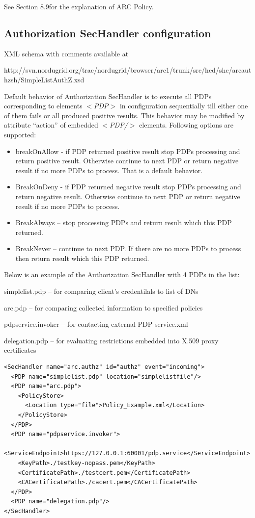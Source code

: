\documentclass{article}                            %
\begin{document}
See Section 8.9for the explanation of ARC Policy.


\subsection{Authorization SecHandler configuration} %
\label{subsec:authzhandler_conf}
XML schema with comments available at

http://svn.nordugrid.org/trac/nordugrid/browser/arc1/trunk/src/hed/shc/arcauthzsh/SimpleListAuthZ.xsd

Default behavior of Authorization SecHandler is to execute all PDPs corresponding to elements \textit{$<$PDP$>$} in configuration sequentially till either one of them fails or all produced positive results. This behavior may be modified by attribute ``action'' of embedded \textit{$<$PDP/$>$} elements. Following options are supported:

    \begin{itemize}
        \item breakOnAllow - if PDP returned positive result stop PDPs processing and return positive result. Otherwise continue to next PDP or return negative result if no more PDPs to process. That is a default behavior.
        \item BreakOnDeny - if PDP returned negative result stop PDPs processing and return negative result. Otherwise continue to next PDP or return negative result if no more PDPs to process.
        \item BreakAlways – stop processing PDPs and return result which this PDP returned.
        \item BreakNever – continue to next PDP. If there are no more PDPs to process then return result which this PDP returned.
    \end{itemize}

Below is an example of the Authorization SecHandler with 4 PDPs in the list:

simplelist.pdp – for comparing client's credentilals to list of DNs

arc.pdp – for comparing collected information to specified policies

pdpservice.invoker – for contacting external PDP service.xml

delegation.pdp – for evaluating restrictions embedded into X.509 proxy certificates

\begin{verbatim}
<SecHandler name="arc.authz" id="authz" event="incoming">
  <PDP name="simplelist.pdp" location="simplelistfile"/>
  <PDP name="arc.pdp">
    <PolicyStore>
      <Location type="file">Policy_Example.xml</Location>
    </PolicyStore>
  </PDP>
  <PDP name="pdpservice.invoker">
    <ServiceEndpoint>https://127.0.0.1:60001/pdp.service</ServiceEndpoint>
    <KeyPath>./testkey-nopass.pem</KeyPath>
    <CertificatePath>./testcert.pem</CertificatePath>
    <CACertificatePath>./cacert.pem</CACertificatePath>
  </PDP>
  <PDP name="delegation.pdp"/>
</SecHandler>
\end{verbatim}
\end{document}
